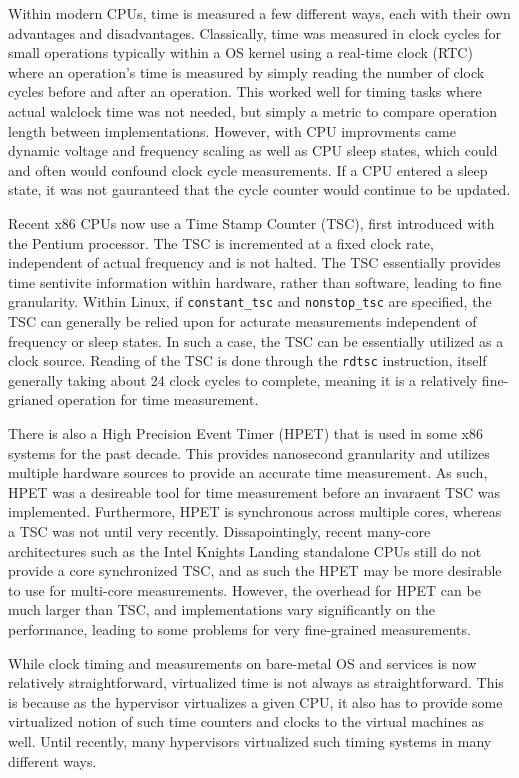 Within modern CPUs, time is measured a few different ways, each with their own advantages and disadvantages.  Classically, time was measured in clock cycles for small operations typically within a OS kernel using a real-time clock (RTC) where an operation's time is measured by simply reading the number of clock cycles before and after an operation. This worked well for timing tasks where actual walclock time was not needed, but simply a metric to compare operation length between implementations. However, with CPU improvments came dynamic voltage and frequency scaling as well as CPU sleep states, which could and often would confound clock cycle measurements.  If a CPU entered a sleep state, it was not gauranteed that the cycle counter would continue to be updated. 

Recent x86 CPUs now use a Time Stamp Counter (TSC), first introduced with the Pentium processor. The TSC is incremented at a fixed clock rate, independent of actual frequency and is not halted. The TSC essentially provides time sentivite information within hardware, rather than software, leading to fine granularity. Within Linux, if \verb|constant_tsc| and \verb|nonstop_tsc| are specified, the TSC can generally be relied upon for acturate measurements independent of frequency or sleep states. In such a case, the TSC can be essentially utilized as a clock source. Reading of the TSC is done through the \verb|rdtsc| instruction, itself generally taking about 24 clock cycles to complete, meaning it is a relatively fine-grianed operation for time measurement.

There is also a High Precision Event Timer (HPET) that is used in some x86 systems for the past decade. This provides nanosecond granularity and utilizes multiple hardware sources to provide an accurate time measurement. As such, HPET was a desireable tool for time measurement before an invaraent TSC was implemented. Furthermore, HPET is synchronous across multiple cores, whereas a TSC was not until very recently.  Dissapointingly, recent many-core architectures such as the Intel Knights Landing standalone CPUs still do not provide a core synchronized TSC, and as such the HPET may be more desirable to use for multi-core measurements. However, the overhead for HPET can be much larger than TSC, and implementations vary significantly on the performance, leading to some problems for very fine-grained measurements. 

While clock timing and measurements on bare-metal OS and services is now relatively straightforward, virtualized time is not always as straightforward.  This is because as the hypervisor virtualizes a given CPU, it also has to provide some virtualized notion of such time counters and clocks to the virtual machines as well.  Until recently, many hypervisors virtualized such timing systems in many different ways. 

